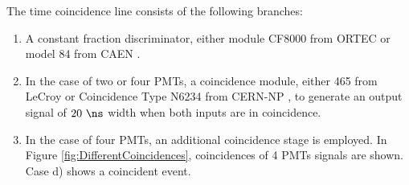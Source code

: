 The time coincidence line consists of the following branches:

\begin{enumerate}

\item{}  A constant fraction discriminator, either module CF8000 from ORTEC \cite{DataSheetDiscriminator} or model 84 from CAEN \cite{DataSheetDiscriminatorCAEN}.

\item{} In the case of two or four PMTs, a coincidence module, either 465 from LeCroy \cite{DataSheetCoincidenceLeCroy} or Coincidence Type N6234 from CERN-NP \cite{DataSheetCoincidenceCERN}, to generate an output signal of $20~\ns$ width when both inputs are in coincidence. 

\item{} In the case of four PMTs, an additional coincidence stage is employed. In Figure \ref{fig:DifferentCoincidences}, coincidences of 4 PMTs signals are shown. Case d) shows a coincident event.






\end{enumerate}
